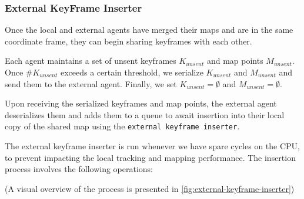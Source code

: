 \subsubsection{External KeyFrame Inserter}
\label{sec:external-key-frame-inserter}
Once the local and external agents have merged their maps and are in the same coordinate frame, they can begin sharing keyframes with each other.

Each agent maintains a set of unsent keyframes $K_{unsent}$ and map points $M_{unsent}$. Once $\#K_{unsent}$ exceeds a certain threshold, we serialize $K_{unsent}$ and $M_{unsent}$ and send them to the external agent. Finally, we set $K_{unsent} = \emptyset$ and $M_{unsent} = \emptyset$.

Upon receiving the serialized keyframes and map points, the external agent deserializes them and adds them to a queue to await insertion into their local copy of the shared map using the \texttt{external keyframe inserter}.

The external keyframe inserter is run whenever we have spare cycles on the CPU, to prevent impacting the local tracking and mapping performance. The insertion process involves the following operations:

(A visual overview of the process is presented in \autoref{fig:external-keyframe-inserter})

